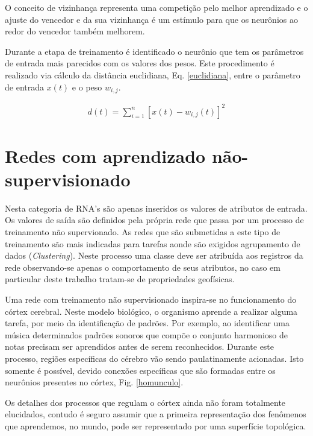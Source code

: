 O conceito de vizinhança representa uma competição pelo melhor aprendizado e o ajuste do vencedor e da sua vizinhança é um estímulo para que os neurônios ao redor do vencedor também melhorem.

Durante a etapa de treinamento é identificado o neurônio que tem os parâmetros de entrada mais parecidos com os valores dos pesos. Este procedimento é realizado via cálculo da distância euclidiana, Eq. \ref{euclidiana}, entre o parâmetro de entrada $x(t)$ e o peso $w_{i,j}$.

\begin{eqnarray}
d(t)= \sum^{n}_{i=1}[x(t)-w_{i,j}(t)]^{2}
\label{euclidiana}
\end{eqnarray}

\section{Redes com aprendizado não-supervisionado}

Nesta categoria de RNA's são apenas inseridos os valores de atributos de entrada. Os valores de saída são definidos pela própria rede que passa por um processo de treinamento não supervionado. As redes que são submetidas a este tipo de treinamento são mais indicadas para tarefas aonde são exigidos agrupamento de dados (\textit{Clustering}). Neste processo uma classe deve ser atribuída aos registros da rede observando-se apenas o comportamento de seus atributos, no caso em particular deste trabalho tratam-se de propriedades geofísicas.

Uma rede com treinamento não supervisionado inspira-se no funcionamento do córtex cerebral. Neste modelo biológico, o organismo aprende a realizar alguma tarefa, por meio da identificação de padrões. Por exemplo, ao identificar uma música determinados padrões sonoros que compõe o conjunto harmonioso de notas precisam ser aprendidos antes de serem reconhecidos. Durante este processo, regiões específicas do cérebro vão sendo paulatinamente acionadas. Isto somente é possível, devido conexões específicas que são formadas entre os neurônios
presentes no córtex, Fig. \ref{homunculo}.

Os detalhes dos processos que regulam o córtex ainda não foram totalmente elucidados, contudo é seguro assumir que a primeira representação dos fenômenos que aprendemos, no mundo, pode ser representado por uma superfície topológica.  

